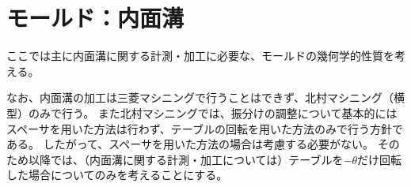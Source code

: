 \chapter{モールド：内面溝}
ここでは主に内面溝に関する計測・加工に必要な、モールドの幾何学的性質を考える。

なお、内面溝の加工は三菱マシニングで行うことはできず、北村マシニング（横型）のみで行う。
また北村マシニングでは、振分けの調整について基本的にはスペーサを用いた方法は行わず、テーブルの回転を用いた方法のみで行う方針である。
したがって、スペーサを用いた方法の場合は考慮する必要がない。
そのため以降では、（内面溝に関する計測・加工については）テーブルを$-\theta$だけ回転した場合についてのみを考えることにする。





